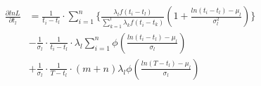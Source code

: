 \begin{eqnarray}
\label{eq:gradT}
\begin{split}
\frac{\partial lnL}{\partial t_l} &= \frac{1}{t_i-t_l} \cdot \sum_{i=1}^{n}\{ \frac{\lambda_l f(t_i-t_l)}{\sum_{k=1}^l\lambda_kf(t_i-t_k)}(1+\frac{ln(t_i-t_l)-\mu_l}{\sigma_l^2}) \} \\
& -\frac{1}{\sigma_l} \cdot \frac{1}{t_i-t_l}\cdot \lambda_l\sum_{i=1}^{n} \phi(\frac{ln(t_i-t_l)-\mu_l}{\sigma_l}) \\
& +\frac{1}{\sigma_l}\cdot \frac{1}{T-t_l}\cdot (m+n)\lambda_l\phi(\frac{ln(T-t_l)-\mu_l}{\sigma_l})
\end{split}
\end{eqnarray}